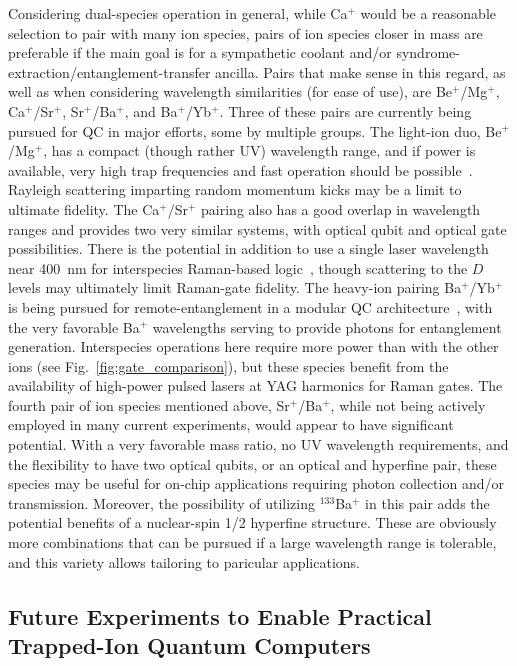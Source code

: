 \documentclass[%
reprint,
 amsmath,amssymb,
]{revtex4-1}
\begin{document}
Considering dual-species operation in general, while Ca$^{+}$ would be a reasonable selection to pair with many ion species, pairs of ion species closer in mass are preferable if the main goal is for a sympathetic coolant and/or syndrome-extraction/entanglement-transfer ancilla.  Pairs that make sense in this regard, as well as when considering wavelength similarities (for ease of use), are Be$^{+}$/Mg$^{+}$, Ca$^{+}$/Sr$^{+}$, Sr$^{+}$/Ba$^{+}$, and Ba$^{+}$/Yb$^{+}$.  Three of these pairs are currently being pursued for QC in major efforts, some by multiple groups.  The light-ion duo, Be$^{+}$/Mg$^{+}$, has a compact (though rather UV) wavelength range, and if power is available, very high trap frequencies and fast operation should be possible~\cite{TanMultiElement2015}.  Rayleigh scattering imparting random momentum kicks may be a limit to ultimate fidelity. The Ca$^{+}$/Sr$^{+}$ pairing also has a good overlap in wavelength ranges and provides two very similar systems, with optical qubit and optical gate possibilities.  There is the potential in addition to use a single laser wavelength near 400~nm for interspecies Raman-based logic~\cite{BallanceThesis2014}, though scattering to the $D$ levels may ultimately limit Raman-gate fidelity.  The heavy-ion pairing Ba$^{+}$/Yb$^{+}$ is being pursued for remote-entanglement in a modular QC architecture~\cite{InlekMultiNode2017}, with the very favorable Ba$^{+}$ wavelengths serving to provide photons for entanglement generation.  Interspecies operations here require more power than with the other ions (see Fig.~\ref{fig:gate_comparison}), but these species benefit from the availability of high-power pulsed lasers at YAG harmonics for Raman gates.  The fourth pair of ion species mentioned above, Sr$^{+}$/Ba$^{+}$, while not being actively employed in many current experiments, would appear to have significant potential. With a very favorable mass ratio, no UV wavelength requirements, and the flexibility to have two optical qubits, or an optical and hyperfine pair, these species may be useful for on-chip applications requiring photon collection and/or transmission.  Moreover, the possibility of utilizing $^{133}$Ba$^{+}$ in this pair adds the potential benefits of a nuclear-spin 1/2 hyperfine structure.  These are obviously more combinations that can be pursued if a large wavelength range is tolerable, and this variety allows tailoring to paricular applications.

\subsection{Future Experiments to Enable Practical Trapped-Ion Quantum Computers}
\end{document}
